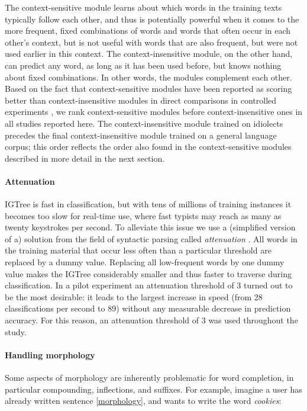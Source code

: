 \documentclass[11pt]{article}
\begin{document}
The context-sensitive module learns about which words in the training texts typically follow each other, and thus is potentially powerful when it comes to the more frequent, fixed combinations of words and words that often occur in each other's context, but is not useful with words that are also frequent, but were not used earlier in this context. The context-insensitive module, on the other hand, can predict any word, as long as it has been used before, but knows nothing about fixed combinations. In other words, the modules complement each other. Based on the fact that context-sensitive modules have been reported as scoring better than context-insensitive modules in direct comparisons in controlled experiments \cite{Lesher+99}, we rank context-sensitive modules before context-insensitive ones in all studies reported here. The context-insensitive module trained on idiolects precedes the final context-insensitive module trained on a general language corpus; this order reflects the order also found in the context-sensitive modules described in more detail in the next section.

\paragraph{Attenuation}

IGTree is fast in classification, but with tens of millions of training instances it becomes too slow for real-time use, where fast typists may reach as many as twenty keystrokes per second. To alleviate this issue we  use a (simplified version of a) solution from the field of syntactic parsing called \emph{attenuation} \cite{eisner96}. All words in the training material that occur less often than a particular threshold are replaced by a dummy value. Replacing all low-frequent words by one dummy value makes the IGTree considerably smaller and thus faster to traverse during classification. In a pilot experiment an attenuation threshold of 3 turned out to be the most desirable: it leads to the largest increase in speed (from 28 classifications per second to 89) without any measurable decrease in prediction accuracy. For this reason, an attenuation threshold of 3 was used throughout the study.

\paragraph{Handling morphology} \label{early}

Some aspects of morphology are inherently problematic for word completion, in particular compounding, inflections, and suffixes. For example, imagine a user has already written sentence \ref{morphology}, and wants to write the word \emph{cookies}:
\end{document}
